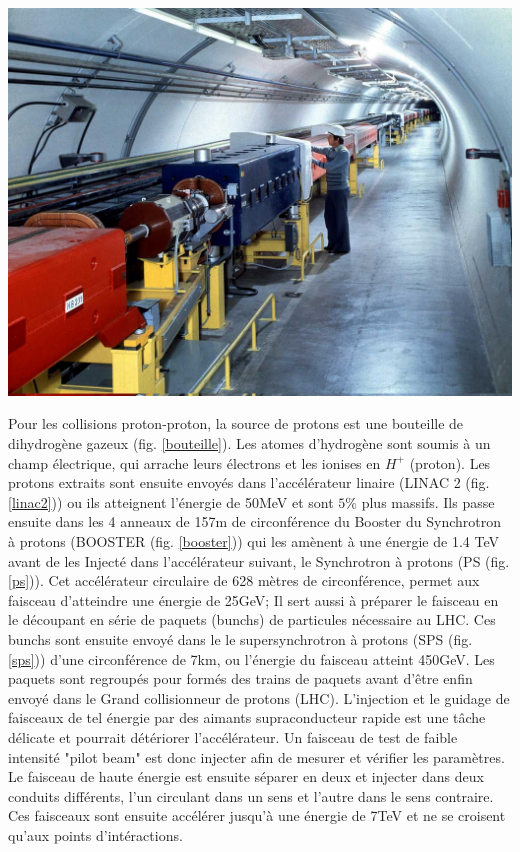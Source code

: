\marginpar
{
	
	\includegraphics[width=\marginparwidth]{LHC/sps.jpg}
    	\label{sps}
}
Pour les collisions proton-proton, la source de protons est une bouteille de dihydrogène gazeux (fig. \ref{bouteille}). Les atomes d’hydrogène sont soumis à un champ électrique, qui arrache leurs électrons et les ionises en $H^{+}$ (proton). Les protons extraits sont ensuite envoyés dans l'accélérateur linaire (LINAC 2 (fig. \ref{linac2})) ou ils atteignent l'énergie de 50MeV et sont $5\%$ plus massifs. Ils passe ensuite dans les 4 anneaux de 157m de circonférence du Booster du Synchrotron à protons (BOOSTER (fig. \ref{booster})) qui les amènent à une énergie de 1.4 TeV avant de les Injecté dans l'accélérateur suivant, le Synchrotron à protons (PS (fig. \ref{ps})). Cet accélérateur circulaire de 628 mètres de circonférence, permet aux faisceau d'atteindre une énergie de 25GeV; Il sert aussi à préparer le faisceau en le découpant en série de paquets (bunchs) de particules nécessaire au LHC. Ces bunchs sont ensuite envoyé dans le le supersynchrotron à protons (SPS (fig. \ref{sps})) d'une circonférence de 7km, ou l'énergie du faisceau atteint 450GeV. Les paquets sont regroupés pour formés des trains de paquets avant d'être enfin envoyé dans le Grand collisionneur de protons (LHC). L'injection et le guidage de faisceaux de tel énergie par des aimants supraconducteur rapide est une tâche délicate et pourrait détériorer l'accélérateur. Un faisceau de test de faible intensité "pilot beam" est donc injecter afin de mesurer et vérifier les paramètres. Le faisceau de haute énergie est ensuite séparer en deux et injecter dans deux conduits différents, l'un circulant dans un sens et l'autre dans le sens contraire. Ces faisceaux sont ensuite accélérer jusqu'à une énergie de 7TeV et ne se croisent qu'aux points d'intéractions.

